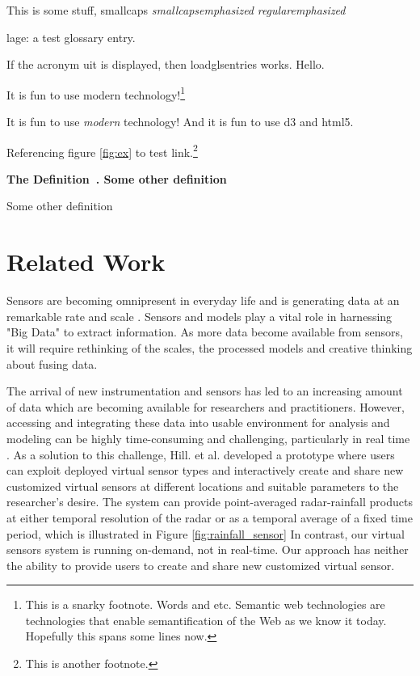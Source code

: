 \documentclass[USenglish]{uit-thesis}
\newcommand{\definition}[1]{%
  \refstepcounter{definition}%
  \par\noindent\textbf{The Definition~\thedefinition. #1}%
  \addcontentsline{def}{definition}
    {\protect\numberline{\thechapter.\thedefinition}#1}\par%
}
\begin{document}
This is some stuff, {\sc smallcaps {\em smallcapsemphasized}} {\em regularemphasized}

\Gls{lage}: a test glossary entry.

If the acronym \ac{uit} is displayed, then loadglsentries works.
Hello.

It is fun to use modern  technology!\footnote{This is a snarky footnote. Words and etc. Semantic web technologies are technologies that enable semantification of the Web as we know it today. Hopefully this spans some lines now.}

It is fun to use \emph{modern } technology! And it is fun to use \ac{d3} and \ac{html5}.

Referencing figure \ref{fig:ex} to test link.\footnote{This is another
footnote.}

\definition{Some other definition}
\fi








\chapter{Related Work}
Sensors are becoming omnipresent in everyday life and is generating data at an remarkable rate and scale \cite{modelling}. Sensors and models play a vital role in harnessing "Big Data" to extract information.
As more data become available from sensors, it will require rethinking of the scales, the processed models and creative thinking about fusing data.


The arrival of new instrumentation and sensors has led to an increasing amount of data which are becoming available for researchers and practitioners. However, accessing and integrating these data into usable environment for analysis and modeling can be highly time-consuming and challenging, particularly in real time \cite{hill}.
As a solution to this challenge, Hill. et al. developed a prototype where users can exploit deployed virtual sensor types and interactively create and share new customized virtual sensors at different locations and suitable parameters to the researcher's desire.
The system can provide point-averaged radar-rainfall products at either temporal resolution of the radar or as a temporal average of a fixed time period, which is illustrated in Figure \ref{fig:rainfall_sensor}
In contrast, our virtual sensors system is running on-demand, not in real-time. Our approach has neither the ability to provide users to create and share new customized virtual sensor. 
\end{document}
